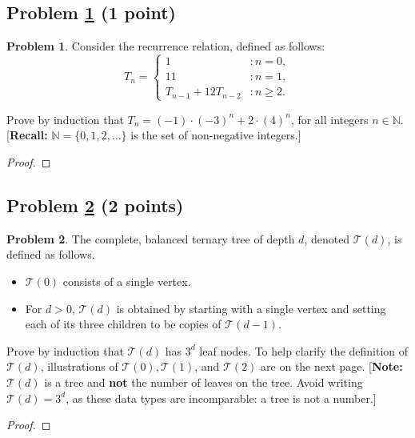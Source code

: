 \documentclass[11pt]{article}
\theoremstyle{definition}
\theoremstyle{definition}
\newtheorem{required}{Problem}
\theoremstyle{definition}
\begin{document}
\newpage
\subsection{Problem \ref{Induction2} (1 point)} 
\begin{required} \label{Induction2}
Consider the recurrence relation, defined as follows:
\[
T_{n} = \begin{cases} 1 & : n = 0, \\
11 & : n = 1, \\
T_{n-1} + 12 T_{n-2} & : n \geq 2.
\end{cases}
\]

\noindent Prove by induction that $T_{n} = (-1) \cdot (-3)^{n} + 2 \cdot (4)^{n}$, for all integers $n \in \mathbb{N}$. [\textbf{Recall:} $\mathbb{N} = \{0, 1, 2, \ldots \}$ is the set of non-negative integers.]
\end{required}

\begin{proof}
\end{proof}


\newpage
\subsection{Problem \ref{Induction3} (2 points)}
\begin{required} \label{Induction3}
The complete, balanced ternary tree of depth $d$, denoted $\mathcal{T}(d)$, is defined as follows. 
\begin{itemize}
\item $\mathcal{T}(0)$ consists of a single vertex.
\item For $d > 0$, $\mathcal{T}(d)$ is obtained by starting with a single vertex and setting each of its three children to be copies of $\mathcal{T}(d-1)$.
\end{itemize}

\noindent Prove by induction that $\mathcal{T}(d)$ has $3^{d}$ leaf nodes. To help clarify the definition of $\mathcal{T}(d)$, illustrations of $\mathcal{T}(0), \mathcal{T}(1)$, and $\mathcal{T}(2)$ are on the next page. [\textbf{Note:} $\mathcal{T}(d)$ is a tree and \textbf{not} the number of leaves on the tree. Avoid writing $\mathcal{T}(d) = 3^{d}$, as these data types are incomparable: a tree is not a number.]
\end{required}

\begin{proof}
\end{proof}
\end{document}
